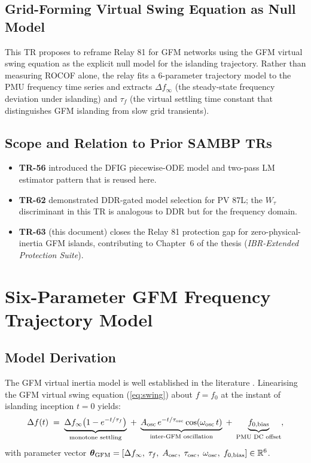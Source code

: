 \documentclass[11pt, a4paper]{article}
\newcommand{\thetaG}{\boldsymbol{\theta}_{\rm GFM}}
\newcommand{\Wtau}{W_\tau}
\begin{document}
\subsection{Grid-Forming Virtual Swing Equation as Null Model}

This TR proposes to reframe Relay 81 for GFM networks using the GFM virtual
swing equation as the explicit null model for the islanding trajectory.
Rather than measuring ROCOF alone, the relay fits a 6-parameter trajectory
model to the PMU frequency time series and extracts $\Delta f_\infty$ (the
steady-state frequency deviation under islanding) and $\tau_f$ (the virtual
settling time constant that distinguishes GFM islanding from slow grid
transients).

\subsection{Scope and Relation to Prior SAMBP TRs}

\begin{itemize}
  \item \textbf{TR-56} \cite{SAMBP_TR56} introduced the DFIG piecewise-ODE
    model and two-pass LM estimator pattern that is reused here.
  \item \textbf{TR-62} \cite{SAMBP_TR62} demonstrated DDR-gated model
    selection for PV 87L;
    the $\Wtau$ discriminant in this TR is analogous to DDR but for the
    frequency domain.
  \item \textbf{TR-63} (this document) closes the Relay 81 protection gap
    for zero-physical-inertia GFM islands, contributing to Chapter~6 of the
    thesis (\emph{IBR-Extended Protection Suite}).
\end{itemize}


\section{Six-Parameter GFM Frequency Trajectory Model}
\label{sec:model}

\subsection{Model Derivation}

The GFM virtual inertia model is well established in the literature
\cite{DArco2015, Rocabert2012}.  Linearising the GFM virtual swing equation
(\ref{eq:swing}) about $f = f_0$
at the instant of islanding inception $t = 0$ yields:
\begin{equation}
  \Delta f(t) \;=\;
  \underbrace{\Delta f_\infty\bigl(1 - e^{-t/\tau_f}\bigr)}_{\text{monotone settling}}
  \;+\;
  \underbrace{A_{\rm osc}\,e^{-t/\tau_{\rm osc}}\cos(\omega_{\rm osc}\,t)}_{\text{inter-GFM oscillation}}
  \;+\;
  \underbrace{f_{0,\rm bias}}_{\text{PMU DC offset}},
  \label{eq:gfm_model}
\end{equation}
with parameter vector
$\thetaG = [\Delta f_\infty,\;\tau_f,\;A_{\rm osc},\;\tau_{\rm osc},\;
\omega_{\rm osc},\;f_{0,\rm bias}] \in \mathbb{R}^6$.
\end{document}
